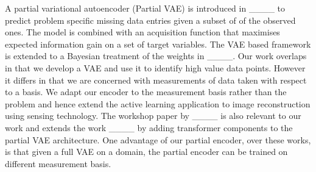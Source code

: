 A partial variational autoencoder (Partial VAE) is introduced in ____ to predict problem specific missing data entries given a subset of of the observed ones. The model is combined with an acquisition function that maximises expected information gain on a set of target variables. The VAE based framework is extended to a Bayesian treatment of the weights in ____. Our work overlaps in that we develop a VAE and use it to identify high value data points. However it differs in that we are concerned with measurements of data taken with respect to a basis. We adapt our encoder to the measurement basis rather than the problem and hence extend the active learning application to image reconstruction using sensing technology. The workshop paper by ____ is also relevant to our work and extends the work ____ by adding transformer components to the partial VAE architecture. One advantage of our partial encoder, over these works, is that given a full VAE on a domain, the partial encoder can be trained on different measurement basis.

